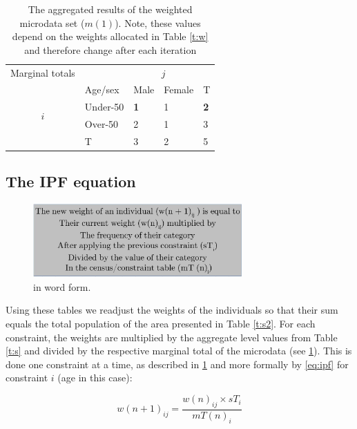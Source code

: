 \documentclass[a4paper, 11pt, twoside]{article}
\begin{document}
\begin{table}[htbp]
\centering
\caption[The aggregated results of the weighted
microdata set]{The aggregated results of the weighted
microdata set ($m(1)$).
Note, these values depend on the
weights allocated in Table \ref{t:w} and therefore
 change after each iteration}

\begin{tabular}{cllll}\toprule
Marginal totals&  & \multicolumn{2}{c}{$j$} & \\
& Age/sex & Male & Female & T\\ \midrule
\multirow{2}{*}{$i$} & Under-50 & \textbf{1} & 1 & \textbf{2}\\
& Over-50 & 2 & 1 &3 \\
& T & 3 & 2 &5\\
\bottomrule
\end{tabular}
\label{t:m}
\end{table}

\subsection{The IPF equation} \label{ipfeq}

\begin{figure}
   \includegraphics[width=8cm]{equation1}
 \caption{ in word form.}
\label{feq}
\end{figure}

Using these tables we readjust the weights of the
individuals so that their sum equals the total population of the area presented
in Table \ref{t:s2}.
For each constraint, the weights are multiplied
by the aggregate level values from Table \ref{t:s} and divided by the
respective marginal total of the microdata (see \cref{t:m}).
This is done one constraint at a time, as described in
\cref{feq} and more formally by
\cref{eq:ipf} for constraint $i$ (age in this case):



\begin{equation}
w(n+1)_{ij} = \frac{w(n)_{ij} \times sT_{i}}{mT(n)_{i}}
\label{eq:ipf}
\end{equation}
\end{document}
